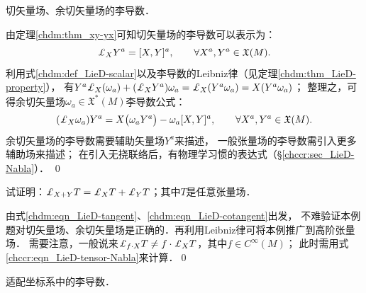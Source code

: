\begin{example}
    切矢量场、余切矢量场的李导数．
\end{example}
由定理\ref{chdm:thm_xy-yx}可知切矢量场的李导数可以表示为：
\begin{equation}\label{chdm:eqn_LieD-tangent}
    \Lie_{X} Y^{a} = [X, Y]^a , \qquad \forall X^a, Y^a \in \mathfrak{X}(M).
\end{equation}
利用式\eqref{chdm:def_LieD-scalar}以及李导数的Leibniz律（见定理\ref{chdm:thm_LieD-property}），
有$Y^a \Lie_{X}( \omega_a ) +(\Lie_{X}Y^a) \omega_a 
= \Lie_{X}(Y^a \omega_a ) = X(Y^a \omega_a) $；
整理之，可得余切矢量场$\omega_a\in \mathfrak{X}^*(M)$李导数公式：
\begin{equation}\label{chdm:eqn_LieD-cotangent}
    (\Lie_{X} \omega_a ) Y^a = X\bigl(\omega_a Y^a\bigr) 
    - \omega_a [X, Y]^a, \qquad \forall X^a, Y^a \in \mathfrak{X}(M).
\end{equation}
余切矢量场的李导数需要辅助矢量场$Y^a$来描述，
一般张量场的李导数需引入更多辅助场来描述；
在引入无挠联络后，有物理学习惯的表达式（\S \ref{chccr:sec_LieD-Nabla}）．
\qed

\begin{example}
    试证明：$\Lie_{X+Y} T = \Lie_{X} T  +\Lie_{Y} T $；其中$T$是任意张量场．
\end{example}
由式\eqref{chdm:eqn_LieD-tangent}、\eqref{chdm:eqn_LieD-cotangent}出发，
不难验证本例题对切矢量场、余切矢量场是正确的．再利用Leibniz律可将本例推广到高阶张量场．
需要注意，一般说来$\Lie_{f\cdot X} T \neq f\cdot \Lie_{X} T$，其中$f\in C^\infty(M)$；
此时需用式\eqref{chccr:eqn_LieD-tensor-Nabla}来计算．\qed


\begin{example}
    适配坐标系中的李导数．
\end{example}

